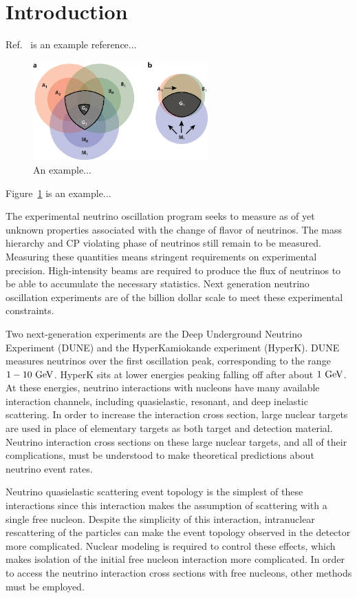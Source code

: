 \section{Introduction}
\label{sec:intro}

Ref.~\cite{Abi:2020wmh} is an example reference...

\begin{figure}[htbp]
  \includegraphics[width=0.6\textwidth]{plots/SampleFigure.eps}
  \caption{An example...}
  \label{fig:example}    
\end{figure}
Figure~\ref{fig:example} is an example...

The experimental neutrino oscillation program seeks to measure
 as of yet unknown properties associated with the change of flavor of neutrinos.
The mass hierarchy and CP violating phase of neutrinos still remain to be measured.
Measuring these quantities means stringent requirements on experimental precision.
High-intensity beams are required to produce the flux of neutrinos
 to be able to accumulate the necessary statistics.
Next generation neutrino oscillation experiments are of the billion dollar scale
 to meet these experimental constraints.

Two next-generation experiments are the Deep Underground Neutrino Experiment (DUNE)
 and the HyperKamiokande experiment (HyperK).
DUNE measures neutrinos over the first oscillation peak,
 corresponding to the range $1-10~{\rm GeV}$.
HyperK sits at lower energies peaking falling off after about $1~{\rm GeV}$.
At these energies, neutrino interactions with nucleons have many available interaction channels,
 including quasielastic, resonant, and deep inelastic scattering.
In order to increase the interaction cross section,
 large nuclear targets are used in place of elementary targets
 as both target and detection material.
Neutrino interaction cross sections on these large nuclear targets,
 and all of their complications,
 must be understood to make theoretical predictions about neutrino event rates.

Neutrino quasielastic scattering event topology is the simplest of these interactions
 since this interaction makes the assumption of scattering with a single free nucleon.
Despite the simplicity of this interaction,
 intranuclear rescattering of the particles can make the event topology observed
 in the detector more complicated.
Nuclear modeling is required to control these effects,
 which makes isolation of the initial free nucleon interaction more complicated.
In order to access the neutrino interaction cross sections with free nucleons,
 other methods must be employed.

